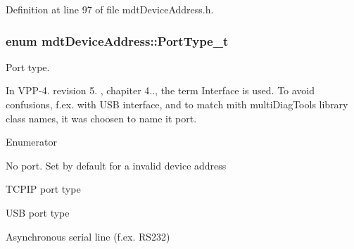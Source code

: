 Definition at line 97 of file mdt\-Device\-Address.\-h.

\hypertarget{classmdt_device_address_a87fedc5c0ede4736bcc939f453bf0ed0}{
\subsubsection[{Port\-Type\-\_\-t}]{\setlength{\rightskip}{0pt plus 5cm}enum {\bf mdt\-Device\-Address\-::\-Port\-Type\-\_\-t}\hspace{0.3cm}{\ttfamily [strong]}}}\label{classmdt_device_address_a87fedc5c0ede4736bcc939f453bf0ed0}


Port type. 

In V\-P\-P-\/4. revision 5. , chapiter 4.., the term Interface is used. To avoid confusions, f.\-ex. with U\-S\-B interface, and to match mith multi\-Diag\-Tools library class names, it was choosen to name it port. \begin{Desc}
\item[Enumerator]\par
\begin{description}
\item[{\em 
\hypertarget{classmdt_device_address_a87fedc5c0ede4736bcc939f453bf0ed0ab50339a10e1de285ac99d4c3990b8693}{N\-O\-N\-E}\label{classmdt_device_address_a87fedc5c0ede4736bcc939f453bf0ed0ab50339a10e1de285ac99d4c3990b8693}
}]No port. Set by default for a invalid device address \item[{\em 
\hypertarget{classmdt_device_address_a87fedc5c0ede4736bcc939f453bf0ed0a487b5042489631a7727321162579c3a5}{T\-C\-P\-I\-P}\label{classmdt_device_address_a87fedc5c0ede4736bcc939f453bf0ed0a487b5042489631a7727321162579c3a5}
}]T\-C\-P\-I\-P port type \item[{\em 
\hypertarget{classmdt_device_address_a87fedc5c0ede4736bcc939f453bf0ed0a7aca5ec618f7317328dcd7014cf9bdcf}{U\-S\-B}\label{classmdt_device_address_a87fedc5c0ede4736bcc939f453bf0ed0a7aca5ec618f7317328dcd7014cf9bdcf}
}]U\-S\-B port type \item[{\em 
\hypertarget{classmdt_device_address_a87fedc5c0ede4736bcc939f453bf0ed0a5100e6dba69c30d5af23e7b0624f12ca}{A\-S\-R\-L}\label{classmdt_device_address_a87fedc5c0ede4736bcc939f453bf0ed0a5100e6dba69c30d5af23e7b0624f12ca}
}]Asynchronous serial line (f.\-ex. R\-S232) \end{description}
\end{Desc}


